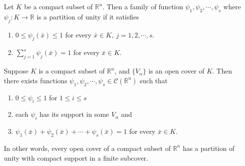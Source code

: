 \begin{remark}
	Let $K$ be a compact subset of $\mathbb{R}^n$.
	Then a family of function $\psi_1,\psi_2,\cdots,\psi_s$ where $\psi_j : K \to \mathbb{R}$ is a partition of unity if it satisfies
	\begin{enumerate}
		\item $0 \le \psi_j(\bar{x}) \le 1$ for every $\bar{x} \in K,\ j = 1,2,\cdots, s$.
		\item $\sum\limits_{j=1}^s \psi_j(\bar{x}) = 1$ for every $\bar{x} \in K$.
	\end{enumerate}
\end{remark}
\begin{theorem}
	Suppose $K$ is a compact subset of $\mathbb{R}^n$, and $\{V_\alpha\}$ is an open cover of $K$.
	Then there exists functions $\psi_1,\psi_2,\cdots,\psi_s \in \mathscr{C}(\mathbb{R}^n)$ such that
	\begin{enumerate}
		\item $0 \le \psi_i \le 1$ for $1 \le i \le s$
		\item each $\psi_i$ has its support in some $V_\alpha$ and
		\item $\psi_1(\bar{x}) + \psi_2(\bar{x}) + \cdots + \psi_s(\bar{x}) = 1$ for every $\bar{x} \in K$.
	\end{enumerate}
	\begin{commentary}
		In other words, every open cover of a compact subset of $\mathbb{R}^n$ has a partition of unity with compact support in a finite subcover.
	\end{commentary}
\end{theorem}
